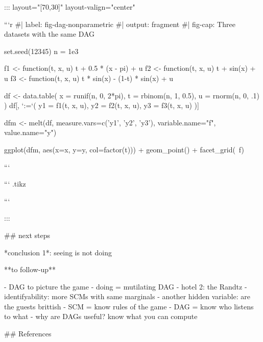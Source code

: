 ::: {layout="[70,30]" layout-valign="center"}

```{r}
#| label: fig-dag-nonparametric
#| output: fragment
#| fig-cap: Three datasets with the same DAG

set.seed(12345)
n = 1e3

f1 <- function(t, x, u) t + 0.5 * (x - pi) + u
f2 <- function(t, x, u) t + sin(x) + u
f3 <- function(t, x, u) t * sin(x) - (1-t) * sin(x) + u

df <- data.table(
  x = runif(n, 0, 2*pi),
  t = rbinom(n, 1, 0.5),
  u = rnorm(n, 0, .1)
)
df[, `:=`(
  y1 = f1(t, x, u),
  y2 = f2(t, x, u),
  y3 = f3(t, x, u)
)]

dfm <- melt(df, measure.vars=c('y1', 'y2', 'y3'),
            variable.name="f", value.name="y")

ggplot(dfm, aes(x=x, y=y, col=factor(t))) + 
  geom_point() + 
  facet_grid(~f)

```

``` {.tikz}

```

:::

## next steps


*conclusion 1*: seeing is not doing

**to follow-up**

- DAG to picture the game
- doing = mutilating DAG
- hotel 2: the Randtz
- identifyability: more SCMs with same marginals
- another hidden variable: are the guests brittish
- SCM = know rules of the game
- DAG = know who listens to what
- why are DAGs useful? know what you can compute



## References

